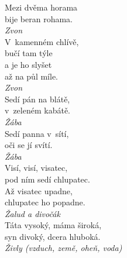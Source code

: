 \begin{multicols}{4}
\noindent
Mezi dvěma horama\\
bije beran rohama.\\[1 mm]
{\sl Zvon}\\

\noindent
V~kamenném chlívě,\\
bučí tam týle\\
a je ho slyšet\\
až na půl míle.\\[1 mm]
{\sl Zvon}\\

\noindent
Sedí pán na blátě,\\
v~zeleném kabátě.\\[1 mm]
{\sl Žába}\\

\noindent
Sedí panna v~sítí,\\
oči se jí svítí.\\[1 mm]
{\sl Žába}\\

\noindent
Visí, visí, visatec,\\
pod ním sedí chlupatec.\\
Až visatec upadne,\\
chlupatec ho popadne.\\[1 mm]
{\sl Žalud a divočák}\\

\noindent
Táta vysoký, máma široká,\\
syn divoký, dcera hluboká.\\[1 mm]
{\sl Živly (vzduch, země, oheň, voda)}\\

\end{multicols}
\clearpage


